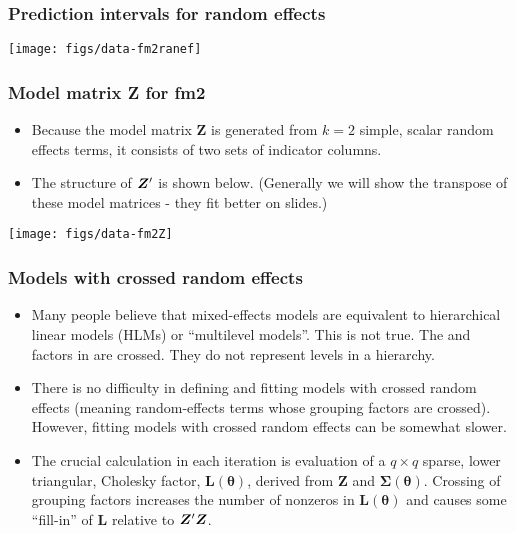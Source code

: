 \begin{frame}[fragile]
  \frametitle{Prediction intervals for random effects}
\texttt{[image: figs/data-fm2ranef]}
\end{frame}

\begin{frame}[fragile]
  \frametitle{Model matrix Z for fm2}
  \begin{itemize}
  \item Because the model matrix $\bm Z$ is generated from $k=2$
    simple, scalar random effects terms, it consists of two sets of
    indicator columns.
  \item The structure of $\bm Z^\prime$ is shown below.  (Generally we
    will show the transpose of these model matrices - they fit better
    on slides.)
  \end{itemize}
  \begin{center}
\texttt{[image: figs/data-fm2Z]}
  \end{center}
\end{frame}

\begin{frame}
  \frametitle{Models with crossed random effects}
  \begin{itemize}
  \item Many people believe that mixed-effects models are equivalent
    to hierarchical linear models (HLMs) or ``multilevel models''.
    This is not true.  The  and  factors in
     are crossed.  They do not represent levels in a hierarchy.
  \item There is no difficulty in defining and fitting models with
    crossed random effects (meaning random-effects terms whose
    grouping factors are crossed).  However, fitting models with
    crossed random effects can be somewhat slower.
  \item The crucial calculation in each  iteration is
    evaluation of a $q\times q$ sparse, lower triangular, Cholesky
    factor, $\bm L(\bm\theta)$, derived from $\bm Z$ and
    $\bm\Sigma(\bm\theta)$.  Crossing of grouping factors increases
    the number of nonzeros in $\bm L(\bm\theta)$ and causes some
    ``fill-in'' of $\bm L$ relative to $\bm Z^\prime\bm Z$.
  \end{itemize}
\end{frame}

